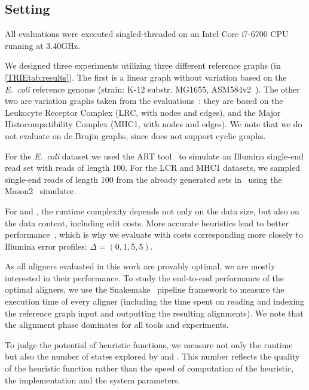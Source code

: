 \subsection{Setting}
All evaluations were executed singled-threaded on an Intel Core i7-6700 CPU running
at 3.40GHz.

We designed three experiments utilizing three different reference graphs (in
\cref{TRIEtab:results}). The first is a linear graph without variation based on the
\textit{E.~coli} reference genome (strain: K-12 substr. MG1655,
ASM584v2~\cite{howe2019ensembl}). The other two are variation graphs taken from
the \pasgal evaluations~\cite{jain_accelerating_2019}: they are based on the
Leukocyte Receptor Complex (LRC, with  nodes and
 edges), and the Major Histocompatibility Complex (MHC1, with
 nodes and  edges).
%
We note that we do not evaluate on de Brujin graphs, since \pasgal does not
support cyclic graphs.

For the \textit{E.~coli} dataset we used the ART tool~\cite{huang_art_2012} to simulate an
Illumina single-end read set with  reads of length 100. For the LCR and
MHC1 datasets, we sampled  single-end reads of length 100 from the already
generated sets in~\cite{jain_accelerating_2019} using the
Mason2~\cite{holtgrewe_mason_2010} simulator.

For \dijkstra and \astarix, the runtime complexity depends not only on the data
size, but also on the data content, including edit costs. More accurate
heuristics lead to better \A performance~\cite{pearl_discovery_1983}, which is
why we evaluate \astarix with costs corresponding more closely to Illumina error
profiles: $\Delta=(0,1,5,5)$.

As all aligners evaluated in this work are provably optimal, we are mostly
interested in their performance.
%
To study the end-to-end performance of the optimal aligners, we use the
Snakemake~\cite{koster_snakemakescalable_2012} pipeline framework to measure the
execution time of every aligner (including the time spent on reading and
indexing the reference graph input and outputting the resulting alignments). We
note that the alignment phase dominates for all tools and experiments.

To judge the potential of heuristic functions, we measure not only the runtime
but also the number of states explored by \astarix and \dijkstra. This number
reflects the quality of the heuristic function rather than the speed of
computation of the heuristic, the implementation and the system parameters.
